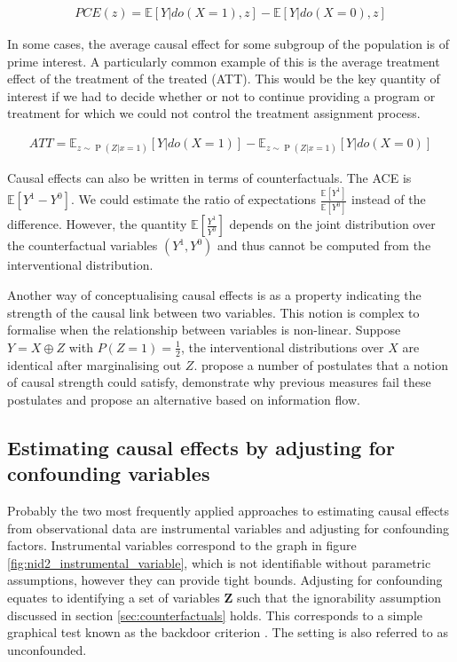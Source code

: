 \documentclass[11pt,a4paper,twoside]{report}
\newcommand{\Esub}[2]{\mathbb E_{#1}\left[{#2}\right]}
\newcommand{\E}[1]{\mathbb E\left[{#1}\right]}
\newcommand{\eqn}[1]{\begin{align}#1\end{align}}
\renewcommand{\P}[1]{\operatorname{P}\left(#1\right)}
\newcommand{\cf}[2]{{#1}^{#2}}
\theoremstyle{plain}
\theoremstyle{definition}
\begin{document}
\eqn{
PCE(z) = \E{Y|do(X=1),z} - \E{Y|do(X=0),z}
}

In some cases, the average causal effect for some subgroup of the population is of prime interest. A particularly common example of this is the average treatment effect of the treatment of the treated (ATT). This would be the key quantity of interest if we had to decide whether or not to continue providing a program or treatment for which we could not control the treatment assignment process. 

\eqn{
ATT = \Esub{z\sim \P{Z|x=1}}{Y|do(X = 1)} - \Esub{z\sim \P{Z|x=1}}{Y|do(X=0)}
}

Causal effects can also be written in terms of counterfactuals. The ACE is $\E{\cf{Y}{1} - \cf{Y}{0}}$. We could estimate the ratio of expectations $\frac{\E{\cf{Y}{1}}}{\E{\cf{Y}{0}}}$ instead of the difference. However, the quantity   $\E{\frac{\cf{Y}{1}}{\cf{Y}{0}}}$ depends on the joint distribution over the counterfactual variables $(\cf{Y}{1},\cf{Y}{0})$ and thus cannot be computed from the interventional distribution. 

Another way of conceptualising causal effects is as a property indicating the strength of the causal link between two variables. This notion is complex to formalise when the relationship between variables is non-linear. Suppose $Y = X \oplus Z$ with $P(Z=1)=\frac{1}{2}$, the interventional distributions over $X$ are identical after marginalising out $Z$. \citet{Janzing2013} propose a number of postulates that a notion of causal strength could satisfy, demonstrate why previous measures fail these postulates and propose an alternative based on information flow. 


\subsection{Estimating causal effects by adjusting for confounding variables}
\label{sec:causal_effect_under_ignorability}
Probably the two most frequently applied approaches to estimating causal effects from observational data are instrumental variables and adjusting for confounding factors. Instrumental variables correspond to the graph in figure \ref{fig:nid2_instrumental_variable}, which is not identifiable without parametric assumptions, however they can provide tight bounds. Adjusting for confounding equates to identifying a set of variables $\boldsymbol{Z}$ such that the ignorability assumption discussed in section \ref{sec:counterfactuals} holds. This corresponds to a simple graphical test known as the backdoor criterion \citep{Pearl2000}. The setting is also referred to as unconfounded. 
\end{document}
